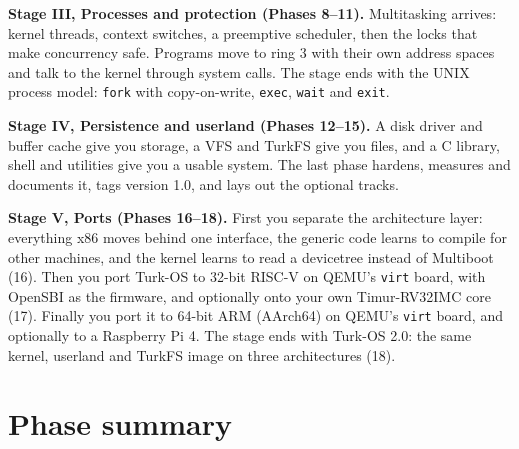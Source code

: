 \documentclass[11pt,a4paper]{article}
\begin{document}
\textbf{Stage III, Processes and protection (Phases 8--11).} Multitasking arrives: kernel threads, context switches,
a preemptive scheduler, then the locks that make concurrency safe. Programs move to ring 3 with their own address
spaces and talk to the kernel through system calls. The stage ends with the UNIX process model: \texttt{fork} with
copy-on-write, \texttt{exec}, \texttt{wait} and \texttt{exit}.

\textbf{Stage IV, Persistence and userland (Phases 12--15).} A disk driver and buffer cache give you storage, a VFS
and TurkFS give you files, and a C library, shell and utilities give you a usable system. The last phase hardens,
measures and documents it, tags version 1.0, and lays out the optional tracks.

\textbf{Stage V, Ports (Phases 16--18).} First you separate the architecture layer: everything x86 moves behind
one interface, the generic code learns to compile for other machines, and the kernel learns to read a devicetree
instead of Multiboot (16). Then you port Turk-OS to 32-bit RISC-V on QEMU's \texttt{virt} board, with OpenSBI as
the firmware, and optionally onto your own Timur-RV32IMC core (17). Finally you port it to 64-bit ARM (AArch64) on
QEMU's \texttt{virt} board, and optionally to a Raspberry Pi 4. The stage ends with Turk-OS 2.0: the same kernel,
userland and TurkFS image on three architectures (18).

\section{Phase summary}
\end{document}
